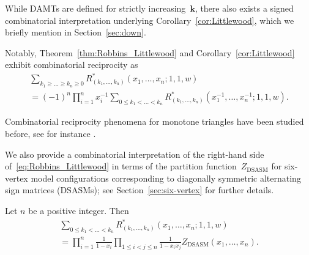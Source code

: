\documentclass[ALCO, Unicode]{cedram}
\DeclareMathOperator{\DSASM}{DSASM}
\newcommand{\boldk}{\boldsymbol{k}}
\begin{document}
	While DAMTs are defined for strictly increasing~$\boldk$, there also exists a signed combinatorial interpretation underlying Corollary~\ref{cor:Littlewood}, which we briefly mention in Section~\ref{sec:down}.
	
	Notably, Theorem~\ref{thm:Robbins_Littlewood} and Corollary~\ref{cor:Littlewood} exhibit combinatorial reciprocity as
	\begin{multline*}
		\sum_{k_1 \ge \dots \ge k_n \ge 0} R^{\ast}_{(k_{1},\ldots,k_{n})}(x_{1},\ldots,x_{n};1,1,w)\\
		= (-1)^n \prod_{i=1}^{n} x_i^{-1} \sum_{0 \le k_1 < \dots < k_n} R^{\ast}_{(k_{1},\ldots,k_{n})}(x_{1}^{-1},\ldots,x_{n}^{-1};1,1,w).
	\end{multline*}
	
	Combinatorial reciprocity phenomena for monotone triangles have been studied before, see for instance 
	\cite{FisRi2013}.
	
	We also provide a combinatorial interpretation of the right-hand side of~\eqref{eq:Robbins_Littlewood} in terms of the partition function~$Z_{\DSASM}$ for six-vertex model configurations corresponding to diagonally symmetric alternating sign matrices (DSASMs); see Section~\ref{sec:six-vertex} for further details.
	
	\begin{thm}
		\label{thm:comb_interpretation_RHS}
		Let $n$ be a positive integer. Then 
		\begin{multline*}
			\sum_{0 \le k_1 < \dots < k_n} R^{\ast}_{(k_{1},\ldots,k_{n})}(x_{1},\ldots,x_{n};1,1,w)\\
			= \prod_{i=1}^{n} \frac{1}{1-x_i} \prod_{1 \le i < j \le n} \frac{1}{1-x_i x_j} Z_{\DSASM} (x_1,\dots,x_n).
		\end{multline*}
	\end{thm} 
	
\end{document}
